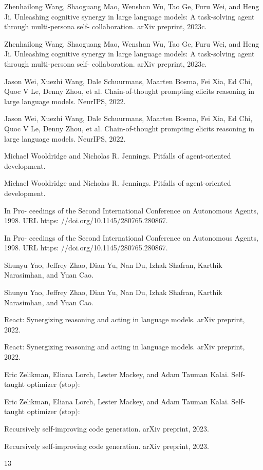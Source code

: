 \documentclass[12pt]{article}
\begin{document}
Zhenhailong Wang, Shaoguang Mao, Wenshan Wu, Tao Ge, Furu Wei, and Heng Ji. Unleashing
cognitive synergy in large language models: A task-solving agent through multi-persona self-
collaboration. arXiv preprint, 2023c.


Zhenhailong Wang, Shaoguang Mao, Wenshan Wu, Tao Ge, Furu Wei, and Heng Ji. Unleashing
cognitive synergy in large language models: A task-solving agent through multi-persona self-
collaboration. arXiv preprint, 2023c.


Jason Wei, Xuezhi Wang, Dale Schuurmans, Maarten Bosma, Fei Xia, Ed Chi, Quoc V Le, Denny
Zhou, et al. Chain-of-thought prompting elicits reasoning in large language models. NeurIPS,
2022.


Jason Wei, Xuezhi Wang, Dale Schuurmans, Maarten Bosma, Fei Xia, Ed Chi, Quoc V Le, Denny
Zhou, et al. Chain-of-thought prompting elicits reasoning in large language models. NeurIPS,
2022.


Michael Wooldridge and Nicholas R. Jennings. Pitfalls of agent-oriented development.


Michael Wooldridge and Nicholas R. Jennings. Pitfalls of agent-oriented development.


In Pro-
ceedings of the Second International Conference on Autonomous Agents, 1998. URL https:
//doi.org/10.1145/280765.280867.


In Pro-
ceedings of the Second International Conference on Autonomous Agents, 1998. URL https:
//doi.org/10.1145/280765.280867.


Shunyu Yao, Jeffrey Zhao, Dian Yu, Nan Du, Izhak Shafran, Karthik Narasimhan, and Yuan Cao.


Shunyu Yao, Jeffrey Zhao, Dian Yu, Nan Du, Izhak Shafran, Karthik Narasimhan, and Yuan Cao.


React: Synergizing reasoning and acting in language models. arXiv preprint, 2022.


React: Synergizing reasoning and acting in language models. arXiv preprint, 2022.


Eric Zelikman, Eliana Lorch, Lester Mackey, and Adam Tauman Kalai. Self-taught optimizer (stop):


Eric Zelikman, Eliana Lorch, Lester Mackey, and Adam Tauman Kalai. Self-taught optimizer (stop):


Recursively self-improving code generation. arXiv preprint, 2023.


Recursively self-improving code generation. arXiv preprint, 2023.


13
\end{document}

